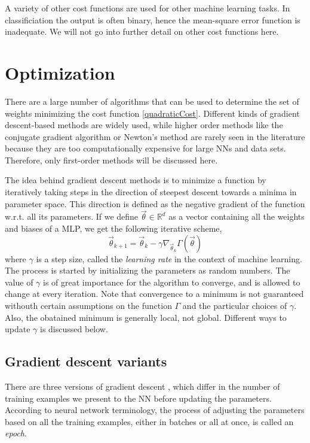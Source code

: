 \documentclass[twoside,english]{uiofysmaster}
\begin{document}
A variety of other cost functions are used for other machine learning tasks. In classificiation the output is often binary, 
hence the mean-square error function is inadequate. We will not go into further detail on other cost functions here. 


\section{Optimization} \label{sec:optimization}
There are a large number of algorithms that can be used to determine the set of weights minimizing the 
cost function \eqref{quadraticCost}. 
Different kinds of gradient descent-based methods are widely used, while higher order methods like
the conjugate gradient algorithm or Newton's method are rarely seen in the literature because they are 
too computationally expensive for large NNs and data sets. Therefore, only first-order methods will be discussed here. 

The idea behind gradient descent methods is to minimize a function by 
iteratively taking steps in the direction of steepest descent towards a minima in parameter space. 
This direction is defined as the negative gradient of the function w.r.t. 
all its parameters. If we define $\vec{\theta} \in \mathbb{R}^d$ as a vector containing all the weights and biases
of a MLP, we get the following iterative scheme,
\begin{equation}
 \vec{\theta}_{k+1} = \vec{\theta}_{k} - \gamma \nabla_{\vec{\theta}_k} \Gamma(\vec{\theta})
 \label{gradientDescent}
\end{equation}
where $\gamma$ is a step size, called the \textit{learning rate} in the context of machine learning. The process is started
by initializing the parameters as random numbers. The value of $\gamma$ is of great importance for the algorithm to converge,
and is allowed to change at every iteration. Note that convergence to 
a minimum is not guaranteed withouth certain assumptions on the function $\Gamma$ and the particular choices of $\gamma$.
Also, the obatained minimum is generally local, not global. 
Different ways to update $\gamma$ is discussed below.


\subsection{Gradient descent variants} \label{gradientDescentVariants}
There are three versions of gradient descent \cite{Ruder16}, which differ in 
the number of training examples we present to the NN before updating the parameters. 
According to neural network terminology, the process of adjusting the parameters based on all the training examples,
either in batches or all at once, is called an \textit{epoch}. 
\end{document}
